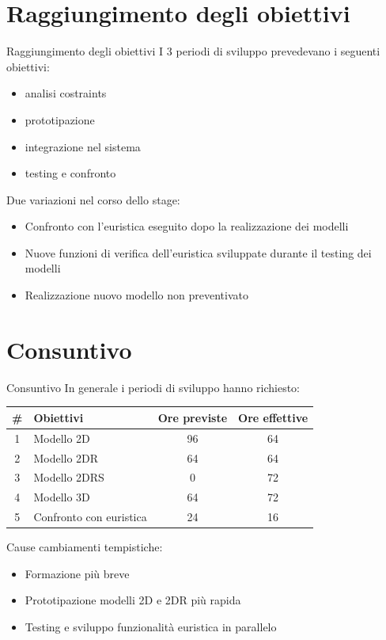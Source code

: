 \documentclass{beamer}
\begin{document}
\section{Raggiungimento degli obiettivi}
\begin{frame}{Raggiungimento degli obiettivi}
	I 3 periodi di sviluppo prevedevano i seguenti obiettivi:
	\begin{itemize}
		\item analisi costraints
		\item prototipazione
		\item integrazione nel sistema
		\item testing e confronto	
	\end{itemize}
	
	Due variazioni nel corso dello stage:
	\begin{itemize}
		\item Confronto con l'euristica eseguito dopo la realizzazione dei modelli
		\item Nuove funzioni di verifica dell'euristica sviluppate durante il testing dei modelli
		\item Realizzazione nuovo modello non preventivato
	\end{itemize}
\end{frame}
\section{Consuntivo}
\begin{frame}{Consuntivo}
	In generale i periodi di sviluppo hanno richiesto:
	\begin{center}
		\begin{tabular}{|c|l|c|c|}
			\hline
			\textbf{\#} & \textbf{Obiettivi} & \textbf{Ore previste} & \textbf{Ore effettive} \\\hline
			1           & Modello 2D               & 96                    & 64                     \\\hline
			2           & Modello 2DR              & 64                    & 64                     \\\hline
			3           & Modello 2DRS             & 0                     & 72                     \\\hline
			4           & Modello 3D               & 64                    & 72                     \\\hline
			5           & Confronto con euristica  & 24                    & 16                     \\\hline
		\end{tabular}
	\end{center}
	Cause cambiamenti tempistiche:
	\begin{itemize}
		\item Formazione pi\`u breve
		\item Prototipazione modelli 2D e 2DR pi\`u rapida
		\item Testing e sviluppo funzionalit\`a euristica in parallelo
	\end{itemize}
\end{frame}
\end{document}
